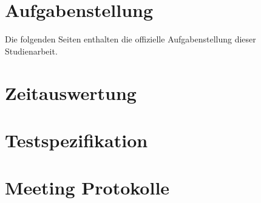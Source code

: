 \documentclass[11pt,a4paper,english,oneside]{book}
\numberwithin{equation}{chapter}
\begin{document}
	\chapter{Aufgabenstellung}
	\label{aufgabenstellung}
	Die folgenden Seiten enthalten die offizielle Aufgabenstellung dieser Studienarbeit.
	
    

	
	\chapter{Zeitauswertung}
	\label{zeitauswertung}
	
	\chapter{Testspezifikation}
	
	\chapter{Meeting Protokolle}
	
	
	
\end{document}
